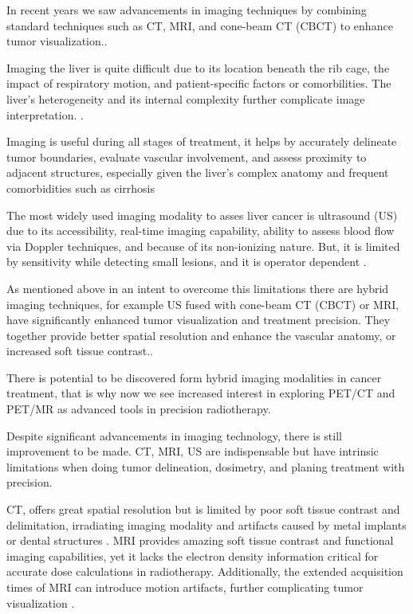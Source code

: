 \documentclass[11pt]{article} %
\begin{document}
\begin{multicols}{2}
In recent years we saw advancements in imaging techniques by combining standard techniques such as CT, MRI, and cone-beam CT (CBCT) to enhance tumor visualization.\cite{floridi2022}.

Imaging the liver is quite difficult due to its location beneath the rib cage, the impact of respiratory motion, and patient-specific factors or comorbilities. The liver’s heterogeneity and its internal complexity further complicate image interpretation. \cite{ferraioli2018}.

Imaging is useful during all stages of treatment, it helps by accurately delineate tumor boundaries, evaluate vascular involvement, and assess proximity to adjacent structures, especially given the liver's complex anatomy and frequent comorbidities such as cirrhosis \cite{floridi2022}

The most widely used imaging modality to asses liver cancer is ultrasound (US) due to its accessibility, real-time imaging capability, ability to assess blood flow via Doppler techniques, and because of its non-ionizing nature. But, it is limited by sensitivity while detecting small lesions, and it is operator dependent \cite{mcmahon2023,ferraioli2018}.

As mentioned above in an intent to overcome this limitations there are hybrid imaging techniques, for example US fused with cone-beam CT (CBCT) or MRI, have significantly enhanced tumor visualization and treatment precision. They together provide better spatial resolution and enhance the vascular anatomy, or increased soft tissue contrast.\cite{floridi2022}.

There is potential to be discovered form hybrid imaging modalities in cancer treatment, that is why now we see increased interest in exploring PET/CT and PET/MR as advanced tools in precision radiotherapy.

Despite significant advancements in imaging technology, there is still improvement to be made. CT, MRI, US are indispensable but have intrinsic limitations when doing tumor delineation, dosimetry, and planing treatment with precision.

CT, offers great spatial resolution but is limited by poor soft tissue contrast and delimitation, irradiating imaging modality and artifacts caused by metal implants or dental structures \cite{decazes2021}. MRI provides amazing soft tissue contrast and functional imaging capabilities, yet it lacks the electron density information critical for accurate dose calculations in radiotherapy. Additionally, the extended acquisition times of MRI can introduce motion artifacts, further complicating tumor visualization \cite{floridi2022}.


\end{multicols}
\end{document}
